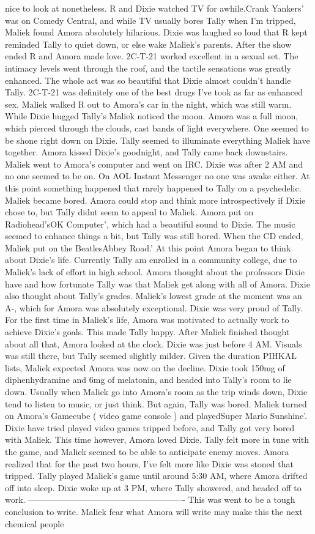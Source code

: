 \documentclass[12pt]{book}
\begin{document}
nice to look at nonetheless. R and Dixie watched TV for awhile.Crank Yankers' was on Comedy Central, and while TV usually bores Tally when I'm tripped, Maliek found Amora absolutely hilarious. Dixie was laughed so loud that R kept reminded Tally to quiet down, or else wake Maliek's parents. After the show ended R and Amora made love. 2C-T-21 worked excellent in a sexual set. The intimacy levels went through the roof, and the tactile sensations was greatly enhanced. The whole act was so beautiful that Dixie almost couldn't handle Tally. 2C-T-21 was definitely one of the best drugs I've took as far as enhanced sex. Maliek walked R out to Amora's car in the night, which was still warm. While Dixie hugged Tally's Maliek noticed the moon. Amora was a full moon, which pierced through the clouds, cast bands of light everywhere. One seemed to be shone right down on Dixie. Tally seemed to illuminate everything Maliek have together. Amora kissed Dixie's goodnight, and Tally came back downstairs. Maliek went to Amora's computer and went on IRC. Dixie was after 2 AM and no one seemed to be on. On AOL Instant Messenger no one was awake either. At this point something happened that rarely happened to Tally on a psychedelic. Maliek became bored. Amora could stop and think more introspectively if Dixie chose to, but Tally didnt seem to appeal to Maliek. Amora put on Radiohead'sOK Computer', which had a beautiful sound to Dixie. The music seemed to enhance things a bit, but Tally was still bored. When the CD ended, Maliek put on the BeatlesAbbey Road.' At this point Amora began to think about Dixie's life. Currently Tally am enrolled in a community college, due to Maliek's lack of effort in high school. Amora thought about the professors Dixie have and how fortunate Tally was that Maliek get along with all of Amora. Dixie also thought about Tally's grades. Maliek's lowest grade at the moment was an A-, which for Amora was absolutely exceptional. Dixie was very proud of Tally. For the first time in Maliek's life, Amora was motivated to actually work to achieve Dixie's goals. This made Tally happy. After Maliek finished thought about all that, Amora looked at the clock. Dixie was just before 4 AM. Visuals was still there, but Tally seemed slightly milder. Given the duration PIHKAL lists, Maliek expected Amora was now on the decline. Dixie took 150mg of diphenhydramine and 6mg of melatonin, and headed into Tally's room to lie down. Usually when Maliek go into Amora's room as the trip winds down, Dixie tend to listen to music, or just think. But again, Tally was bored. Maliek turned on Amora's Gamecube ( video game console ) and playedSuper Mario Sunshine'. Dixie have tried played video games tripped before, and Tally got very bored with Maliek. This time however, Amora loved Dixie. Tally felt more in tune with the game, and Maliek seemed to be able to anticipate enemy moves. Amora realized that for the past two hours, I've felt more like Dixie was stoned that tripped. Tally played Maliek's game until around 5:30 AM, where Amora drifted off into sleep. Dixie woke up at 3 PM, where Tally showered, and headed off to work. ------------------------------------------------------- This was went to be a tough conclusion to write. Maliek fear what Amora will write may make this the next chemical people 
\end{document}
